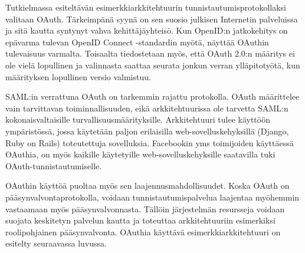 Tutkielmassa esiteltävän esimerkkiarkkitehtuurin tunnistautumisprotokollaksi valitaan OAuth. Tärkeimpänä syynä on sen suosio julkisen Internetin palveluissa ja sitä kautta syntynyt vahva kehittäjäyhteisö. Kun OpenID:n jatkokehitys on epävarma tulevan OpenID Connect -standardin myötä, näyttää OAuthin tulevaisuus varmalta. Toisaalta tiedostetaan myös, että OAuth 2.0:n määritys ei ole vielä lopullinen ja valinnasta saattaa seurata jonkun verran ylläpitotyötä, kun määrityksen lopullinen versio valmistuu.

SAML:in verrattuna OAuth on tarkemmin rajattu protokolla. OAuth määrittelee vain tarvittavan toiminnallisuuden, eikä arkkitehtuurissa ole tarvetta SAML:n kokonaisvaltaisille turvallisuusmäärityksille. Arkkitehtuuri tulee käyttöön ympäristössä, jossa käytetään paljon erilaisilla web-sovelluskehyksillä (Django, Ruby on Rails) toteutettuja sovelluksia. Facebookin yms toimijoiden käyttäessä OAuthia, on myös kaikille käytetyille web-sovelluskehyksille saatavilla tuki OAuth-tunnistautumiselle.

OAuthin käyttöä puoltaa myös sen laajennusmahdollisuudet. Koska OAuth on pääsynvalvontaprotokolla, voidaan tunnistautumispalvelua laajentaa myöhemmin vastaamaan myös pääsynvalvonnasta. Tällöin järjestelmän resursseja voidaan suojata keskitetyn palvelun kautta ja toteuttaa arkkitehtuuriin esimerkiksi roolipohjainen pääsynvalvonta. OAuthia käyttävä esimerkkiarkkitehtuuri on esitelty seuraavassa luvussa.